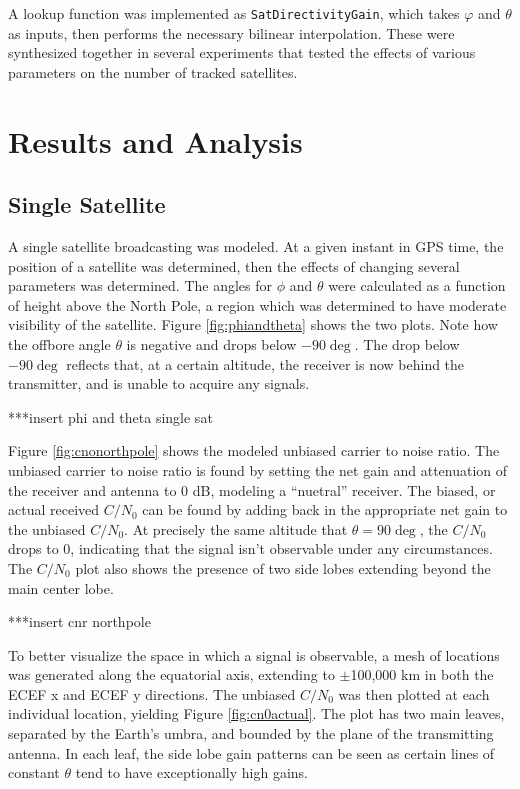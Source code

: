 \documentclass[11pt]{article}
\newcommand{\cnr}{C/N_0}
\begin{document}
A lookup function was implemented as \verb|SatDirectivityGain|, which takes $\varphi$ and $\theta$ as inputs, then performs the necessary bilinear interpolation. These were synthesized together in several experiments that tested the effects of various parameters on the number of tracked satellites.


\section{Results and Analysis}
\subsection{Single Satellite}
A single satellite broadcasting was modeled. At a given instant in GPS time, the position of a satellite was determined, then the effects of changing several parameters was determined. The angles for $\phi$ and $\theta$ were calculated as a function of height above the North Pole, a region which was determined to have moderate visibility of the satellite. Figure \ref{fig:phiandtheta} shows the two plots. Note how the offbore angle $\theta$ is negative and drops below $-90\deg$. The drop below $-90\deg$ reflects that, at a certain altitude, the receiver is now behind the transmitter, and is unable to acquire any signals.

***insert phi and theta single sat

Figure \ref{fig:cnonorthpole} shows the modeled unbiased carrier to noise ratio. The unbiased carrier to noise ratio is found by setting the net gain and attenuation of the receiver and antenna to 0 dB, modeling a ``nuetral'' receiver. The biased, or actual received $\cnr$ can be found by adding back in the appropriate net gain to the unbiased $\cnr$. At precisely the same altitude that $\theta = 90\deg$, the $\cnr$ drops to 0, indicating that the signal isn't observable under any circumstances. The $\cnr$ plot also shows the presence of two side lobes extending beyond the main center lobe.

***insert cnr northpole

To better visualize the space in which a signal is observable, a mesh of locations was generated along the equatorial axis, extending to $\pm$100,000 km in both the ECEF x and ECEF y directions. The unbiased $\cnr$ was then plotted at each individual location, yielding Figure \ref{fig:cn0actual}. The plot has two main leaves, separated by the Earth's umbra, and bounded by the plane of the transmitting antenna. In each leaf, the side lobe gain patterns can be seen as certain lines of constant $\theta$ tend to have exceptionally high gains.
\end{document}
